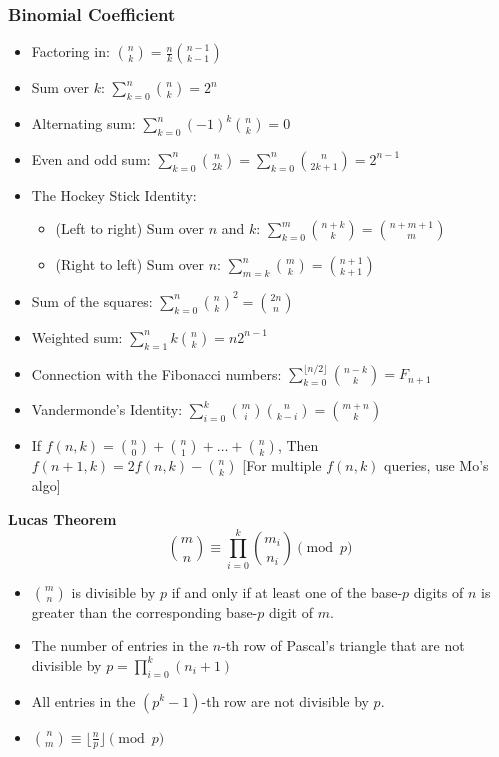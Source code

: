 \subsubsection{Binomial Coefficient}
\begin{itemize}
  \item Factoring in: \( \binom{n}{k} = \frac{n}{k} \binom{n - 1}{k - 1} \)
  \item Sum over \( k \): \( \sum_{k = 0}^n \binom{n}{k} = 2^n \)
  \item Alternating sum: \( \sum_{k = 0}^n (-1)^k \binom{n}{k} = 0 \)
  \item Even and odd sum: \( \sum_{k = 0}^n \binom{n}{2k} = \sum_{k = 0}^n \binom{n}{2k + 1} = 2^{n - 1} \)
  \item The Hockey Stick Identity:
    \begin{itemize}
      \item (Left to right) Sum over \( n \) and \( k \): \( \sum_{k = 0}^m \binom{n + k}{k} = \binom{n + m + 1}{m} \)
      \item (Right to left) Sum over \( n \): \( \sum_{m = k}^n \binom{m}{k} = \binom{n + 1}{k + 1} \)
    \end{itemize}
  \item Sum of the squares: \( \sum_{k = 0}^n \binom{n}{k}^2 = \binom{2n}{n} \)
  \item Weighted sum: \( \sum_{k = 1}^n k \binom{n}{k} = n2^{n - 1} \)
  \item Connection with the Fibonacci numbers: \( \sum_{k = 0}^{\lfloor n/2 \rfloor}\binom{n - k}{k} = F_{n + 1} \)
  \item Vandermonde's Identity: \( \sum_{i = 0}^k \binom{m}{i} \binom{n}{k - i} = \binom{m + n}{k} \)
  \item If \( f(n, k) = \binom{n}{0} + \binom{n}{1} + \dots + \binom{n}{k} \), Then \( f(n + 1, k) = 2 f(n, k) - \binom{n}{k} \) [For multiple \( f(n, k) \) queries, use Mo's algo]
\end{itemize}

\textbf{Lucas Theorem}
\[ \binom{m}{n} \equiv \prod_{i = 0}^k \binom{m_i}{n_i} \pmod p \]
\begin{itemize}
  \item \( \binom{m}{n} \) is divisible by $p$ if and only if at least one of the base-\(p\) digits of \( n \) is greater than the corresponding base-\( p \) digit of \( m \).
  \item The number of entries in the \( n \)-th row of Pascal's triangle that are not divisible by \( p = \prod_{i = 0}^k (n_i + 1) \)
  \item All entries in the \( (p^{k} - 1) \)-th row are not divisible by \( p \).
  \item \( \binom{n}{m} \equiv \lfloor \frac{n}{p} \rfloor \pmod p \)
\end{itemize}

